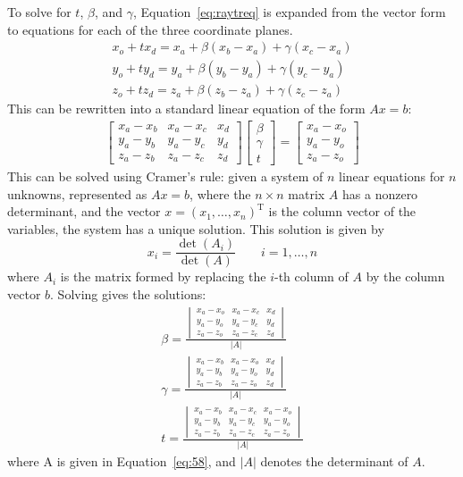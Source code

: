 To solve for $t$, $\beta$, and $\gamma$, Equation~\ref{eq:raytreq} is expanded from the vector form to equations for each of the three coordinate planes.
\begin{align}
x_o + tx_d = x_a + \beta(x_b-x_a) + \gamma(x_c-x_a) \\
y_o + ty_d = y_a + \beta(y_b-y_a) + \gamma(y_c-y_a) \\
z_o + tz_d = z_a + \beta(z_b-z_a) + \gamma(z_c-z_a)
\end{align}
This can be rewritten into a standard linear equation of the form $Ax = b$:
\begin{align}
\label{eq:58}
\begin{bmatrix}
x_a - x_b & x_a - x_c & x_d \\
y_a - y_b & y_a - y_c & y_d \\
z_a - z_b & z_a - z_c & z_d
\end{bmatrix}
\begin{bmatrix}
\beta \\ \gamma \\ t
\end{bmatrix}
= \begin{bmatrix}
x_a - x_o \\ y_a - y_o \\ z_a - z_o
\end{bmatrix}
\end{align}
This can be solved using Cramer's rule: given a system of $n$ linear equations for $n$ unknowns, represented as $Ax = b$, where the $n \times n$ matrix $A$ has a nonzero determinant, and the vector $x = (x_1, \ldots, x_n)^\mathrm{T}$ is the column vector of the variables, the system has a unique solution.
This solution is given by
\begin{equation}
x_i = \frac{\det(A_i)}{\det(A)} \qquad i = 1, \ldots, n
\end{equation}
where  $A_i$  is the matrix formed by replacing the $i$-th column of $A$ by the column vector $b$.
Solving gives the solutions:
\begin{align}
\beta = \frac{\begin{vmatrix}
x_a - x_o & x_a - x_c & x_d \\
y_a - y_o & y_a - y_c & y_d \\
z_a - z_o & z_a - z_c & z_d
\end{vmatrix}}{|A|} \\
\gamma = \frac{\begin{vmatrix}
x_a - x_b & x_a - x_o & x_d \\
y_a - y_b & y_a - y_o & y_d \\
z_a - z_b & z_a - z_o & z_d
\end{vmatrix}}{|A|} \\
t = \frac{\begin{vmatrix}
x_a - x_b & x_a - x_c & x_a - x_o \\
y_a - y_b & y_a - y_c & y_a - y_o \\
z_a - z_b & z_a - z_c & z_a - z_o
\end{vmatrix}}{|A|} 
\end{align}
where A is given in Equation~\ref{eq:58}, and $|A|$ denotes the determinant of $A$.

